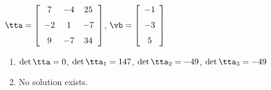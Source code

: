 {$\tta = \left[ \begin {array}{ccc} 7&-4&25\\\noalign{\medskip}-2&1&-7
\\\noalign{\medskip}9&-7&34\end {array} \right]$,
 \quad
$\vb = \left[ \begin {array}{c} -1\\\noalign{\medskip}-3\\\noalign{\medskip}
5\end {array} \right]$}
{\begin{enumerate}
\item	$\det{\tta} = 0$, $\det{\tta_1} = 147$, $\det{\tta_2} = -49$, $\det{\tta_3} = -49$
\item No solution exists.
\end{enumerate}
}
 


